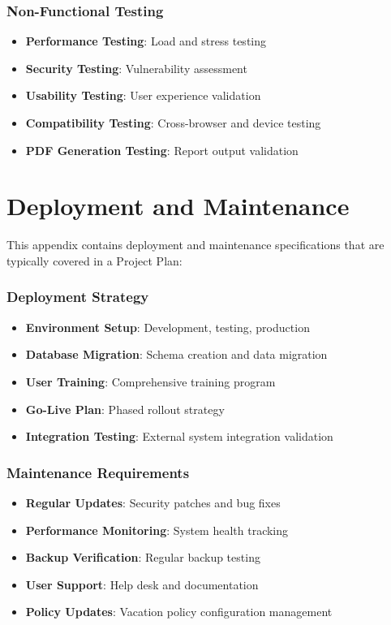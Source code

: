 \documentclass[12pt,a4paper]{article}
\begin{document}
\subsubsection{Non-Functional Testing}
\begin{itemize}
    \item \textbf{Performance Testing}: Load and stress testing
    \item \textbf{Security Testing}: Vulnerability assessment
    \item \textbf{Usability Testing}: User experience validation
    \item \textbf{Compatibility Testing}: Cross-browser and device testing
    \item \textbf{PDF Generation Testing}: Report output validation
\end{itemize}

\section{Deployment and Maintenance}
This appendix contains deployment and maintenance specifications that are typically covered in a Project Plan:

\subsubsection{Deployment Strategy}
\begin{itemize}
    \item \textbf{Environment Setup}: Development, testing, production
    \item \textbf{Database Migration}: Schema creation and data migration
    \item \textbf{User Training}: Comprehensive training program
    \item \textbf{Go-Live Plan}: Phased rollout strategy
    \item \textbf{Integration Testing}: External system integration validation
\end{itemize}

\subsubsection{Maintenance Requirements}
\begin{itemize}
    \item \textbf{Regular Updates}: Security patches and bug fixes
    \item \textbf{Performance Monitoring}: System health tracking
    \item \textbf{Backup Verification}: Regular backup testing
    \item \textbf{User Support}: Help desk and documentation
    \item \textbf{Policy Updates}: Vacation policy configuration management
\end{itemize}
\end{document}
